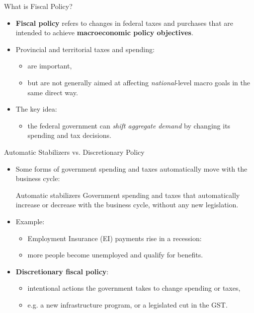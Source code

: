 \documentclass[aspectratio=169]{beamer}
\begin{document}
\begin{frame}{What is Fiscal Policy?}
\transfade
\begin{itemize}[<+->]
  \item \textbf{Fiscal policy} refers to changes in \alert{federal taxes and purchases}
        that are intended to achieve \textbf{macroeconomic policy objectives}.
  \item Provincial and territorial taxes and spending:
  \begin{itemize}[<+->]
    \item are important,
    \item but are not generally aimed at affecting \emph{national}-level macro goals in the same direct way.
  \end{itemize}
  \item The key idea:
  \begin{itemize}[<+->]
    \item the federal government can \emph{shift aggregate demand} by changing its spending and tax decisions.
  \end{itemize}
\end{itemize}
\end{frame}

\begin{frame}{Automatic Stabilizers vs. Discretionary Policy}
\transfade
\begin{itemize}[<+->]
  \item Some forms of government spending and taxes automatically move with the business cycle:
  \begin{block}{Automatic stabilizers}
    Government spending and taxes that \alert{automatically increase or decrease}
    with the business cycle, without any new legislation.
  \end{block}
  \item Example:
  \begin{itemize}[<+->]
    \item Employment Insurance (EI) payments rise in a recession:
    \item more people become unemployed and qualify for benefits.
  \end{itemize}
  \item \textbf{Discretionary fiscal policy}:
  \begin{itemize}[<+->]
    \item intentional actions the government takes to change spending or taxes,
    \item e.g. a new infrastructure program, or a legislated cut in the GST.
  \end{itemize}
\end{itemize}
\end{frame}
\end{document}

